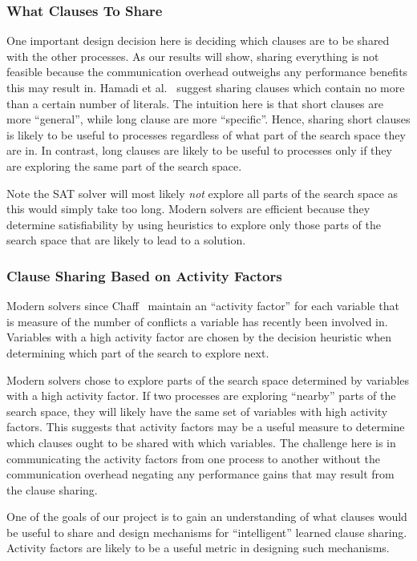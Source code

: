 \documentclass[letterpaper, compsoc, conference]{IEEEtran}
\begin{document}
\subsubsection{What Clauses To Share}

One important design decision here is deciding which clauses are to be shared
with the other processes. As our results will show, sharing everything is not
feasible because the communication overhead outweighs any performance benefits
this may result in. Hamadi et al.~\cite{Hamadi} suggest sharing clauses which
contain no more than a certain number of literals. The intuition here is that
short clauses are more ``general'', while long clause are more ``specific''.
Hence, sharing short clauses is likely to be useful to processes regardless of
what part of the search space they are in. In contrast, long clauses are likely
to be useful to processes only if they are exploring the same part of the
search space. 

Note the SAT solver will most likely \textit{not} explore all parts of the
search space as this would simply take too long. Modern solvers are efficient
because they determine satisfiability by using heuristics to explore only
those parts of the search space that are likely to lead to a solution.

\subsubsection{Clause Sharing Based on Activity Factors}
Modern solvers since Chaff~\cite{CHAFF} maintain an ``activity factor'' for
each variable that is measure of the number of conflicts a variable has
recently been involved in. Variables with a high activity factor are chosen
by the decision heuristic when determining which part of the search to explore
next. 

Modern solvers chose to explore parts of the search space determined by
variables with a high activity factor.  If two processes are exploring
``nearby'' parts of the search space, they will likely have the same set of
variables with high activity factors. This suggests that activity factors may
be a useful measure to determine which clauses ought to be shared with which
variables. The challenge here is in communicating the activity factors from one
process to another without the communication overhead negating any performance
gains that may result from the clause sharing.

One of the goals of our project is to gain an understanding of what clauses
would be useful to share and design mechanisms for ``intelligent'' learned
clause sharing.  Activity factors are likely to be a useful metric in designing
such mechanisms.
\end{document}
